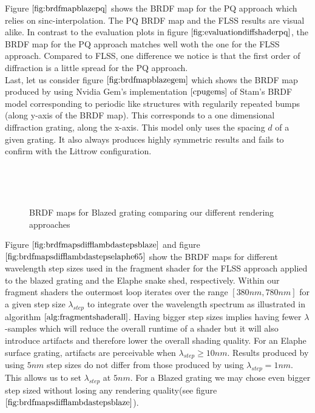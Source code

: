 Figure $\ref{fig:brdfmapblazepq}$ shows the BRDF map for the PQ approach which relies on sinc-interpolation. The PQ BRDF map and the FLSS results are visual alike. In contrast to the evaluation plots in figure $\ref{fig:evaluationdiffshaderpq}$, the BRDF map for the PQ approach matches well woth the one for the FLSS approach. Compared to FLSS, one difference we notice is that the first order of diffraction is a little spread for the PQ approach. \\

Last, let us consider figure $\ref{fig:brdfmapblazegem}$ which shows the BRDF map produced by using Nvidia Gem's implementation $\cite{cpugems}$ of Stam's BRDF model corresponding to periodic like structures with regularily repeated bumps (along y-axis of the BRDF map). This corresponds to a one dimensional diffraction grating, along the x-axis. This model only uses the spacing $d$ of a given grating. It also always produces highly symmetric results and fails to confirm with the Littrow configuration.   

\begin{figure}[H]
  \centering
~

~
    
\caption[BRDF Map: Our Approaches applied on a Blazed Grating]{BRDF maps for Blazed grating comparing our different rendering approaches}
\label{fig:brdfmapsdiffrenderingapproaches}
\end{figure}

Figure $\ref{fig:brdfmapsdifflambdastepsblaze}$ and figure $\ref{fig:brdfmapsdifflambdastepselaphe65}$ show the BRDF maps for different wavelength step sizes used in the fragment shader for the FLSS approach applied to the blazed grating and the Elaphe snake shed, respectively. Within our fragment shaders the outermost loop iterates over the range $[380nm, 780nm]$ for a given step size $\lambda_{step}$ to integrate over the wavelength spectrum as illustrated in algorithm $\ref{alg:fragmentshaderall}$. Having bigger step sizes implies having fewer $\lambda$-samples which will reduce the overall runtime of a shader but it will also introduce artifacts and therefore lower the overall shading quality. For an Elaphe surface grating, artifacts are perceivable when $\lambda_{step} \geq 10nm$. Results produced by using $5nm$ step sizes do not differ from those produced by using $\lambda_{step}= 1nm$. This allows us to set $\lambda_{step}$ at $5nm$. For a Blazed grating we may chose even bigger step sized without losing any rendering quality(see figure $\ref{fig:brdfmapsdifflambdastepsblaze}$).   

